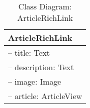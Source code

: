 \begin{table}[H]
\centering
\caption{Class Diagram: ArticleRichLink}

\hspace{1em}
\renewcommand{\arraystretch}{1.7}

\begin{tabular}{|l|}
\hline
\textbf{ArticleRichLink} \\
\hline
– title: Text \\
– description: Text \\
– image: Image \\
– article: ArticleView \\
\hline
\end{tabular}
\end{table}
